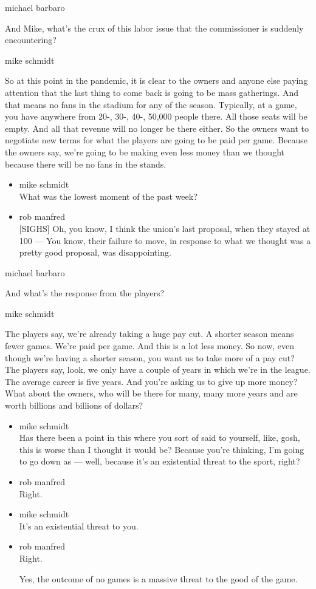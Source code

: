 michael barbaro

And Mike, what's the crux of this labor issue that the commissioner is
suddenly encountering?

mike schmidt

So at this point in the pandemic, it is clear to the owners and anyone
else paying attention that the last thing to come back is going to be
mass gatherings. And that means no fans in the stadium for any of the
season. Typically, at a game, you have anywhere from 20-, 30-, 40-,
50,000 people there. All those seats will be empty. And all that revenue
will no longer be there either. So the owners want to negotiate new
terms for what the players are going to be paid per game. Because the
owners say, we're going to be making even less money than we thought
because there will be no fans in the stands.

\begin{itemize}
\item
  mike schmidt\\
  What was the lowest moment of the past week?
\item
  rob manfred\\
  {[}SIGHS{]} Oh, you know, I think the union's last proposal, when they
  stayed at 100 --- You know, their failure to move, in response to what
  we thought was a pretty good proposal, was disappointing.
\end{itemize}

michael barbaro

And what's the response from the players?

mike schmidt

The players say, we're already taking a huge pay cut. A shorter season
means fewer games. We're paid per game. And this is a lot less money. So
now, even though we're having a shorter season, you want us to take more
of a pay cut? The players say, look, we only have a couple of years in
which we're in the league. The average career is five years. And you're
asking us to give up more money? What about the owners, who will be
there for many, many more years and are worth billions and billions of
dollars?

\begin{itemize}
\item
  mike schmidt\\
  Has there been a point in this where you sort of said to yourself,
  like, gosh, this is worse than I thought it would be? Because you're
  thinking, I'm going to go down as --- well, because it's an
  existential threat to the sport, right?
\item
  rob manfred\\
  Right.
\item
  mike schmidt\\
  It's an existential threat to you.
\item
  rob manfred\\
  Right.

  Yes, the outcome of no games is a massive threat to the good of the
  game.
\end{itemize}

